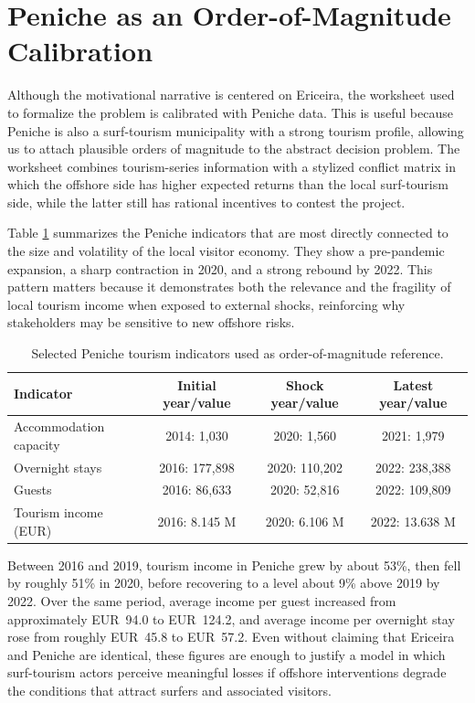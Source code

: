 \documentclass[final,times,authoryear]{elsarticle}
\begin{document}
\section{Peniche as an Order-of-Magnitude Calibration}
\label{sec_peniche}

Although the motivational narrative is centered on Ericeira, the worksheet used to formalize the problem is calibrated with Peniche data. This is useful because Peniche is also a surf-tourism municipality with a strong tourism profile, allowing us to attach plausible orders of magnitude to the abstract decision problem. The worksheet combines tourism-series information with a stylized conflict matrix in which the offshore side has higher expected returns than the local surf-tourism side, while the latter still has rational incentives to contest the project.

Table \ref{tab:peniche_series} summarizes the Peniche indicators that are most directly connected to the size and volatility of the local visitor economy. They show a pre-pandemic expansion, a sharp contraction in 2020, and a strong rebound by 2022. This pattern matters because it demonstrates both the relevance and the fragility of local tourism income when exposed to external shocks, reinforcing why stakeholders may be sensitive to new offshore risks.

\begin{table}[H]
\centering
\caption{Selected Peniche tourism indicators used as order-of-magnitude reference.}
\label{tab:peniche_series}
\begin{tabular}{lccc}
\toprule
Indicator & Initial year/value & Shock year/value & Latest year/value \\
\midrule
Accommodation capacity & 2014: 1,030 & 2020: 1,560 & 2021: 1,979 \\
Overnight stays & 2016: 177,898 & 2020: 110,202 & 2022: 238,388 \\
Guests & 2016: 86,633 & 2020: 52,816 & 2022: 109,809 \\
Tourism income (EUR) & 2016: 8.145 M & 2020: 6.106 M & 2022: 13.638 M \\
\bottomrule
\end{tabular}
\end{table}

Between 2016 and 2019, tourism income in Peniche grew by about 53\%, then fell by roughly 51\% in 2020, before recovering to a level about 9\% above 2019 by 2022. Over the same period, average income per guest increased from approximately EUR~94.0 to EUR~124.2, and average income per overnight stay rose from roughly EUR~45.8 to EUR~57.2. Even without claiming that Ericeira and Peniche are identical, these figures are enough to justify a model in which surf-tourism actors perceive meaningful losses if offshore interventions degrade the conditions that attract surfers and associated visitors.
\end{document}
